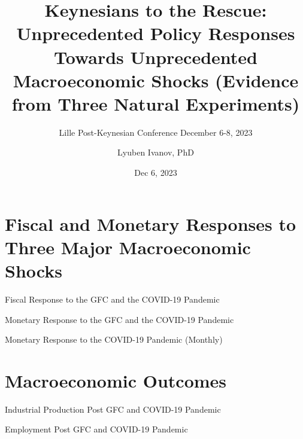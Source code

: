 \documentclass{beamer}
\title{Keynesians to the Rescue: Unprecedented Policy Responses Towards Unprecedented Macroeconomic Shocks (Evidence from Three Natural Experiments)}
\subtitle{Lille Post-Keynesian Conference 
\newline December 6-8, 2023 }
\date{Dec 6, 2023}
\author{Lyuben Ivanov, PhD}
\institute{Faculty of Economics and Business, Sofia University St. Kliment Ohridski}
\begin{document}
\maketitle

\section{Fiscal and Monetary Responses to Three Major Macroeconomic Shocks}

\begin{frame}{Fiscal Response to the GFC and the COVID-19 Pandemic}

\begin{figure}[h!]
     \centering
     
\end{figure} 
	
\end{frame}

\begin{frame}{Monetary Response to the GFC and the COVID-19 Pandemic}

\begin{figure}[h!]
     \centering
     
\end{figure} 
	
\end{frame}

\begin{frame}{Monetary Response to the COVID-19 Pandemic (Monthly)}

\begin{figure}[h!]
     \centering
     
\end{figure} 
	
\end{frame}


\section{Macroeconomic Outcomes}

\begin{frame}{Industrial Production Post GFC and COVID-19 Pandemic}

\begin{figure}[h!]
     \centering
     
\end{figure} 
	
\end{frame}

\begin{frame}{Employment Post GFC and COVID-19 Pandemic}

\begin{figure}[h!]
     \centering
     
\end{figure} 
	
\end{frame}
\end{document}
